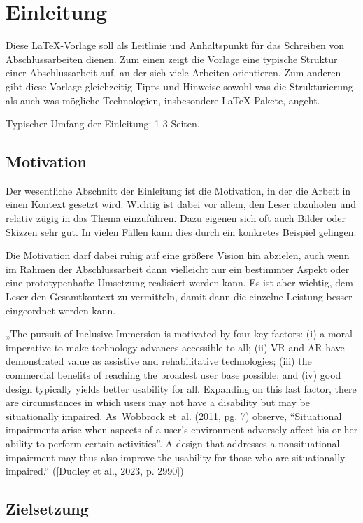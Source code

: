 \chapter{Einleitung}

Diese \LaTeX-Vorlage soll als Leitlinie und Anhaltspunkt für das Schreiben von Abschlussarbeiten dienen. Zum einen zeigt die Vorlage eine typische Struktur einer Abschlussarbeit auf, an der sich viele Arbeiten orientieren. Zum anderen gibt diese Vorlage gleichzeitig Tipps und Hinweise sowohl was die Strukturierung als auch was mögliche Technologien, insbesondere \LaTeX-Pakete, angeht.

Typischer Umfang der Einleitung: 1-3 Seiten.

\section{Motivation}

Der wesentliche Abschnitt der Einleitung ist die Motivation, in der die Arbeit in einen Kontext gesetzt wird. Wichtig ist dabei vor allem, den Leser abzuholen und relativ zügig in das Thema einzuführen. Dazu eigenen sich oft auch Bilder oder Skizzen sehr gut. In vielen Fällen kann dies durch ein konkretes Beispiel gelingen.

Die Motivation darf dabei ruhig auf eine größere Vision hin abzielen, auch wenn im Rahmen der Abschlussarbeit dann vielleicht nur ein bestimmter Aspekt oder eine prototypenhafte Umsetzung realisiert werden kann. Es ist aber wichtig, dem Leser den Gesamtkontext zu vermitteln, damit dann die einzelne Leistung besser eingeordnet werden kann.

„The pursuit of Inclusive Immersion is motivated by four key factors: (i) a moral imperative to make technology advances accessible to all; (ii) VR and AR have demonstrated value as assistive and rehabilitative technologies; (iii) the commercial benefits of reaching the broadest user base possible; and (iv) good design typically yields better usability for all. Expanding on this last factor, there are circumstances in which users may not have a disability but may be situationally impaired. As Wobbrock et al. (2011, pg. 7) observe, “Situational impairments arise when aspects of a user’s environment adversely affect his or her ability to perform certain activities”. A design that addresses a nonsituational impairment may thus also improve the usability for those who are situationally impaired.“ ([Dudley et al., 2023, p. 2990])


\section{Zielsetzung}


